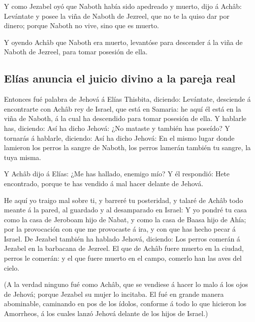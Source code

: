  Y como Jezabel oyó que Naboth había sido apedreado y
muerto, dijo á Achâb: Levántate y posee la viña de Naboth de Jezreel,
que no te la quiso dar por dinero; porque Naboth no vive, sino que es
muerto.

 Y oyendo Achâb que Naboth era muerto, levantóse para
descender á la viña de Naboth de Jezreel, para tomar posesión de ella.

\hypertarget{eluxedas-anuncia-el-juicio-divino-a-la-pareja-real}{%
\subsection{Elías anuncia el juicio divino a la pareja
real}\label{eluxedas-anuncia-el-juicio-divino-a-la-pareja-real}}

 Entonces fué palabra de Jehová á Elías Thisbita, diciendo:
 Levántate, desciende á encontrarte con Achâb rey de
Israel, que está en Samaria: he aquí él está en la viña de Naboth, á la
cual ha descendido para tomar posesión de ella.  Y hablarle
has, diciendo: Así ha dicho Jehová: ¿No mataste y también has poseído? Y
tornarás á hablarle, diciendo: Así ha dicho Jehová: En el mismo lugar
donde lamieron los perros la sangre de Naboth, los perros lamerán
también tu sangre, la tuya misma.

 Y Achâb dijo á Elías: ¿Me has hallado, enemigo mío? Y él
respondió: Hete encontrado, porque te has vendido á mal hacer delante de
Jehová.

 He aquí yo traigo mal sobre ti, y barreré tu posteridad, y
talaré de Achâb todo meante á la pared, al guardado y al desamparado en
Israel:  Y yo pondré tu casa como la casa de Jeroboam hijo
de Nabat, y como la casa de Baasa hijo de Ahía; por la provocación con
que me provocaste á ira, y con que has hecho pecar á Israel.
 De Jezabel también ha hablado Jehová, diciendo: Los perros
comerán á Jezabel en la barbacana de Jezreel.  El que de
Achâb fuere muerto en la ciudad, perros le comerán: y el que fuere
muerto en el campo, comerlo han las aves del cielo.

 (A la verdad ninguno fué como Achâb, que se vendiese á
hacer lo malo á los ojos de Jehová; porque Jezabel su mujer lo incitaba.
 El fué en grande manera abominable, caminando en pos de
los ídolos, conforme á todo lo que hicieron los Amorrheos, á los cuales
lanzó Jehová delante de los hijos de Israel.)

